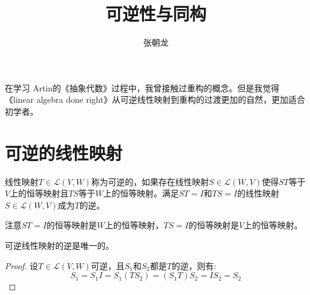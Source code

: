 \documentclass[10pt,a4paper,UTF8]{article}
\author{张朝龙}
\date{}
\title{可逆性与同构}
\begin{document}
\maketitle
\tableofcontents
{}
在学习 Artin的《抽象代数》过程中，我曾接触过重构的概念。但是我觉得《linear algebra done right》从可逆线性映射到重构的过渡更加的自然，更加适合初学者。
\section{可逆的线性映射}
\label{sec:org81862df}


\begin{definition}
线性映射\(T\in \mathcal{L}(V,W)\)称为可逆的，如果存在线性映射\(S\in \mathcal{L}(W,V)\)使得\(ST\)等于\(V\)上的恒等映射且\(TS\)等于\(W\)上的恒等映射。满足\(ST=I\)和\(TS=I\)的线性映射\(S\in \mathcal{L}(W,V)\)成为\(T\)的逆。
\end{definition}

注意\(ST=I\)的恒等映射是\(W\)上的恒等映射，\(TS=I\)的恒等映射是\(V\)上的恒等映射。
\begin{theorem}
可逆线性映射的逆是唯一的。
\end{theorem}
\begin{proof}
设\(T\in \mathcal{L}(V,W)\)可逆，且\(S_{1}\)和\(S_{2}\)都是\(T\)的逆，则有:
\[S_{1} = S_{1}I = S_{1}(TS_{2}) = (S_{1}T) S_{2} = IS_{2} = S_{2}\]
\end{proof}
\end{document}
